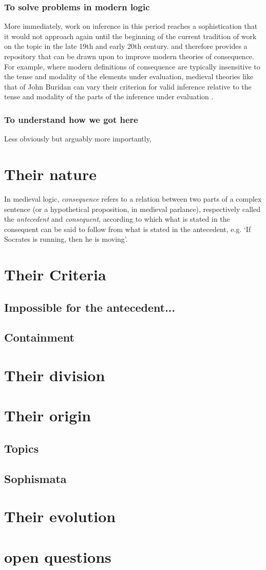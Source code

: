 \documentclass[]{article}
\begin{document}
\subsubsection{To solve problems in modern logic}
More immediately, work on inference in this period reaches a sophistication that it would not approach again until the beginning of the current tradition of work on the topic in the late 19th and early 20th century. and therefore provides a repository that can be drawn upon to improve modern theories of consequence. For example, where modern definitions of consequence are typically insensitive to the tense and modality of the elements under evaluation, medieval theories like that of John Buridan can vary their criterion for valid inference relative to the tense and modality of the parts of the inference under evaluation \cite{Read2015}.


\subsubsection{To understand how we got here}
Less obviously but arguably more importantly, 
\section{Their nature}
In medieval logic, \emph{consequence} refers to a relation between two parts of a complex sentence (or a hypothetical proposition, in medieval parlance), respectively called the \emph{antecedent} and \emph{consequent}, according to which what is stated in the consequent can be said to follow from what is stated in the antecedent, e.g. `If Socrates is running, then he is moving'. 
\section{Their Criteria}
\subsection{Impossible for the antecedent...}
\subsection{Containment}
\section{Their division}
\section{Their origin}
\subsection{Topics}
\subsection{Sophismata}
\section{Their evolution}
\section{open questions}

\printbibliography
\end{document}
